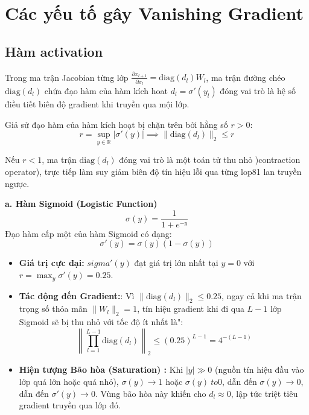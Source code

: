 \documentclass[12pt]{article}
\begin{document}
\section{Các yếu tố gây Vanishing Gradient}

\subsection{Hàm activation}
Trong ma trận Jacobian từng lớp $\frac{\partial x_{l+1}}{\partial x_l} = \text{diag}(d_l) W_l$, ma trận đường chéo $\text{diag}(d_l)$ chứa đạo hàm của hàm kích hoat $d_l = \sigma'(y_l)$ đóng vai trò là hệ số điều tiết biên độ gradient khi truyền qua mội lớp.

Giả sử đạo hàm của hàm kích hoạt bị chặn trên bởi hằng số $r > 0$:
\begin{equation}
    r = \sup_{y \in \mathbb{R}} |\sigma'(y)| \implies \|\text{diag} (d_l)\|_2 \le r
\end{equation}

Nếu $r < 1$, ma trận $\text{diag}(d_l)$ đóng vai trò là một toán tử thu nhỏ )contraction operator), trực tiếp làm suy giảm biên độ tín hiệu lỗi qua từng lop81 lan truyền ngược.

\textbf{a. Hàm Sigmoid (Logistic Function)}
\begin{equation}
\sigma(y) = \frac{1}{1 + e^{-y}}
\end{equation}
Đạo hàm cấp một của hàm Sigmoid có dạng:
\begin{equation}
 \sigma'(y) = \sigma(y)\left(1 - \sigma(y)\right)
\end{equation}

\begin{itemize}
    \item \textbf{Giá trị cực đại:} $sigma'(y)$ đạt giá trị lớn nhất tại $y = 0$ với $r = \max_y \sigma'(y) = 0.25$.
    \item \textbf{Tác động đến Gradient:}: Vì $\|\text{diag}(d_l)\|_2 \le 0.25$, ngay cả khi ma trận trọng số thỏa mãn $ \|W_l\|_2 = 1$, tín hiệu gradient khi đi qua $L-1$ lớp Sigmoid sẽ bị thu nhỏ với tốc độ ít nhất là":
    \begin{equation}
        \left \| \prod_{l=1}^{L-1} \text{diag}(d_l) \right\|_2 \le (0.25)^{L-1} = 4^{-(L-1)}
    \end{equation}
    \item \textbf{Hiện tượng Bão hòa (Saturation) :} Khi $|y| \gg 0$ (nguồn tín hiệu đầu vào lớp quá lớn hoặc quá nhỏ), $\sigma(y) \to 1$ hoặc $\sigma(y) \ to 0$, dẫn đến $\sigma(y) \to 0$, dẫn đến $\sigma'(y) \to 0$. Vùng bão hòa này khiến cho $d_l \approx 0$, lập tức triệt tiêu gradient truyền qua lớp đó.
\end{itemize}
\end{document}
